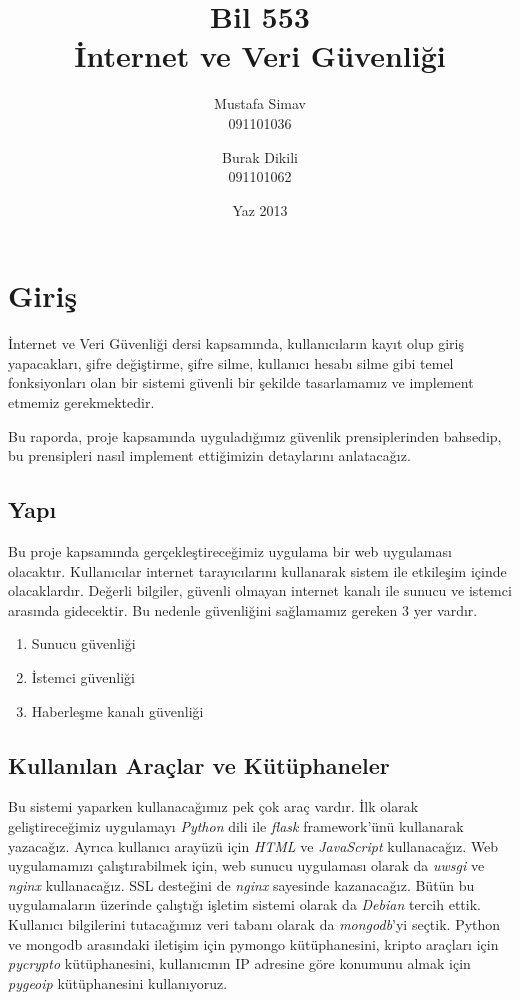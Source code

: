 \documentclass[11pt]{report}
\title{\textbf{Bil 553} \\ İnternet ve Veri Güvenliği}
\author{Mustafa Simav \\
       091101036
    \and
        Burak Dikili \\
        091101062}
\date{Yaz 2013}
\begin{document}
\maketitle

\chapter{Giriş}

İnternet ve Veri Güvenliği dersi kapsamında, kullanıcıların kayıt olup giriş yapacakları, şifre değiştirme, şifre silme, kullanıcı hesabı silme gibi temel fonksiyonları olan bir sistemi güvenli bir şekilde tasarlamamız ve implement etmemiz gerekmektedir.

Bu raporda, proje kapsamında uyguladığımız güvenlik prensiplerinden bahsedip, bu prensipleri nasıl implement ettiğimizin detaylarını anlatacağız.

\section{Yapı}

Bu proje kapsamında gerçekleştireceğimiz uygulama bir web uygulaması olacaktır. Kullanıcılar internet tarayıcılarını kullanarak sistem ile etkileşim içinde olacaklardır. Değerli bilgiler, güvenli olmayan internet kanalı ile sunucu ve istemci arasında gidecektir. Bu nedenle güvenliğini sağlamamız gereken 3 yer vardır.

\begin{enumerate}
\item Sunucu güvenliği
\item İstemci güvenliği
\item Haberleşme kanalı güvenliği
\end{enumerate}

\section{Kullanılan Araçlar ve Kütüphaneler}

Bu sistemi yaparken kullanacağımız pek çok araç vardır. İlk olarak geliştireceğimiz uygulamayı \emph{Python} dili ile \emph{flask} framework'ünü kullanarak yazacağız. Ayrıca kullanıcı arayüzü için \emph{HTML} ve \emph{JavaScript} kullanacağız. Web uygulamamızı çalıştırabilmek için, web sunucu uygulaması olarak da \emph{uwsgi} ve \emph{nginx} kullanacağız. SSL desteğini de \emph{nginx} sayesinde kazanacağız. Bütün bu uygulamaların üzerinde çalıştığı işletim sistemi olarak da \emph{Debian} tercih ettik. Kullanıcı bilgilerini tutacağımız veri tabanı olarak da \emph{mongodb}'yi seçtik. Python ve mongodb arasındaki iletişim için pymongo kütüphanesini, kripto araçları için \emph{pycrypto} kütüphanesini, kullanıcının IP adresine göre konumunu almak için \emph{pygeoip} kütüphanesini kullanıyoruz.
\end{document}

